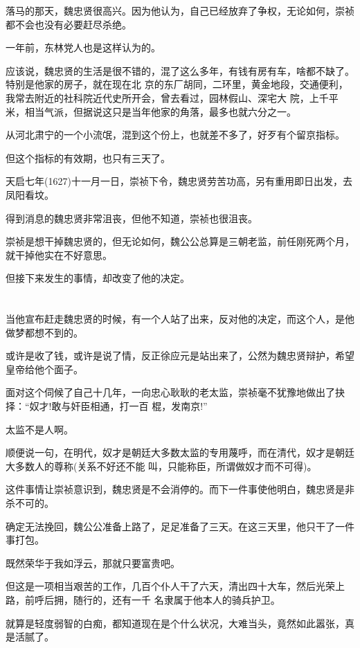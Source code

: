 \documentclass[11pt,a4paper,onecolumn]{article}
\begin{document}
落马的那天，魏忠贤很高兴。因为他认为，自己已经放弃了争权，无论如何，崇祯都不会也没有必要赶尽杀绝。

一年前，东林党人也是这样认为的。

应该说，魏忠贤的生活是很不错的，混了这么多年，有钱有房有车，啥都不缺了。特别是他家的房子，就在现在北
京的东厂胡同，二环里，黄金地段，交通便利，我常去附近的社科院近代史所开会，曾去看过，园林假山、深宅大
院，上千平米，相当气派，但据说这只是当年他家的角落，最多也就六分之一。

从河北肃宁的一个小流氓，混到这个份上，也就差不多了，好歹有个留京指标。

但这个指标的有效期，也只有三天了。

天启七年(1627)十一月一日，崇祯下令，魏忠贤劳苦功高，另有重用\myrule 即日出发，去凤阳看坟。

得到消息的魏忠贤非常沮丧，但他不知道，崇祯也很沮丧。

崇祯是想干掉魏忠贤的，但无论如何，魏公公总算是三朝老监，前任刚死两个月，就干掉他实在不好意思。

但接下来发生的事情，却改变了他的决定。

\section[\thesection]{}

当他宣布赶走魏忠贤的时候，有一个人站了出来，反对他的决定，而这个人，是他做梦都想不到的。

或许是收了钱，或许是说了情，反正徐应元是站出来了，公然为魏忠贤辩护，希望皇帝给他个面子。

面对这个伺候了自己十几年，一向忠心耿耿的老太监，崇祯毫不犹豫地做出了抉择：``奴才!敢与奸臣相通，打一百
棍，发南京!''

太监不是人啊。

顺便说一句，在明代，奴才是朝廷大多数太监的专用蔑呼，而在清代，奴才是朝廷大多数人的尊称(关系不好还不能
叫，只能称臣，所谓做奴才而不可得)。

这件事情让崇祯意识到，魏忠贤是不会消停的。而下一件事使他明白，魏忠贤是非杀不可的。

确定无法挽回，魏公公准备上路了，足足准备了三天。在这三天里，他只干了一件事\myrule 打包。

既然荣华于我如浮云，那就只要富贵吧。

但这是一项相当艰苦的工作，几百个仆人干了六天，清出四十大车，然后光荣上路，前呼后拥，随行的，还有一千
名隶属于他本人的骑兵护卫。

就算是轻度弱智的白痴，都知道现在是个什么状况，大难当头，竟然如此嚣张，真是活腻了。
\end{document}
